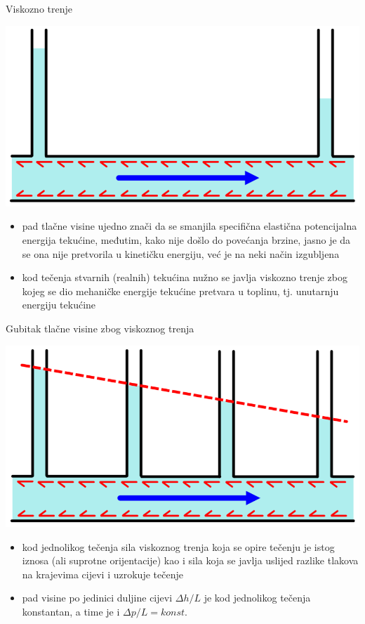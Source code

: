 \documentclass{beamer}
\begin{document}
\begin{frame}{Viskozno trenje}

\begin{center}
\includegraphics[width=0.5\paperwidth]{slike/slika3.PNG}
\par\end{center}
\begin{itemize}
\item pad tlačne visine ujedno znači da se smanjila specifična elastična
potencijalna energija tekućine, međutim, kako nije došlo do povećanja
brzine, jasno je da se ona nije pretvorila u kinetičku energiju, već
je na neki način izgubljena
\item kod tečenja stvarnih (realnih) tekućina nužno se javlja viskozno trenje
zbog kojeg se dio mehaničke energije tekućine pretvara u toplinu,
tj. unutarnju energiju tekućine
\end{itemize}
\end{frame}

\begin{frame}{Gubitak tlačne visine zbog viskoznog trenja}

\begin{center}
\includegraphics[width=0.5\paperwidth]{slike/slika4.PNG}
\par\end{center}
\begin{itemize}
\item kod jednolikog tečenja sila viskoznog trenja koja se opire tečenju
je istog iznosa (ali suprotne orijentacije) kao i sila koja se javlja
uslijed razlike tlakova na krajevima cijevi i uzrokuje tečenje
\item pad visine po jedinici duljine cijevi $\Delta h/L$ je kod jednolikog
tečenja konstantan, a time je i $\Delta p/L=konst.$ 
\end{itemize}
\end{frame}
\end{document}
